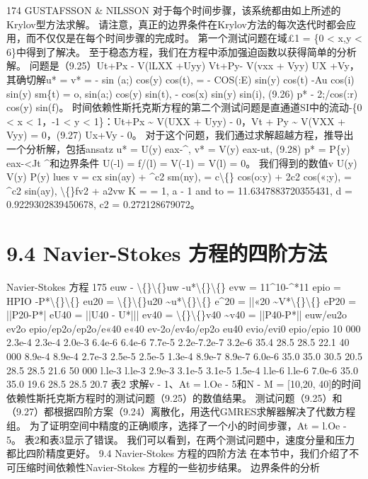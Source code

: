 \documentclass[UTF8,11pt,a4paper,openany,fontset=fandol]{ctexbook}
\begin{document}
174 GUSTAFSSON \& NILSSON 对于每个时间步骤，该系统都由如上所述的Krylov型方法求解。 请注意，真正的边界条件在Krylov方法的每次迭代时都会应用，而不仅仅是在每个时间步骤的完成时。 第一个测试问题在域£1 = \{0 < x,y < 6\}中得到了解决。 至于稳态方程，我们在方程中添加强迫函数以获得简单的分析解。 问题是（9.25）Ut+Px - V(lLXX +Uyy) Vt+Py- V(vxx + Vyy) UX +Vy，其确切解u* = v* = - sin (a;) cos(y) cos(t), = - COS(:E) sin(y) cos(t) -Au cos(i) sin(y) sm\{t) = o, sin(a;) cos(y) sin(t), - cos(x) sin(y) sin(i), (9.26) p* - 2;/cos(:r) cos(y) sin(f)。 时间依赖性斯托克斯方程的第二个测试问题是直通道SI中的流动-\{0 < x < 1，-1 < y < 1\}：Ut+Px \textasciitilde{} V(UXX + Uyy) - 0，Vt + Py \textasciitilde{} V(VXX + Vyy) = 0，(9.27) Ux+Vy - 0。 对于这个问题，我们通过求解超越方程，推导出一个分析解，包括ansatz u* = U(y) eax-\textasciicircum{}, v* = V(y) eax-ut, (9.28) p* = P\{y) eax-<Jt \textasciicircum{}和边界条件 U(-l) = f/(l) = V(-1) = V(l) = 0。 我们得到的数值v U(y) V(y) P(y) lues v = cx sin(ay) + \textasciicircum{}c2 sm(ny), = c\textbackslash\{\} cos(o:y) + 2c2 cos(«;y), = \textasciicircum{}c2 sin(ay), \textbackslash\{\}fv2 + a2vw K = = 1, a - 1 and to = 11.6347883720355431, d = 0.9229302839450678, c2 = 0.272128679072。

\section{9.4 Navier-Stokes 方程的四阶方法}
Navier-Stokes 方程 175 euw - \textbackslash\{\}\textbackslash\{\}uw -u*\textbackslash\{\}\textbackslash\{\} evw = 11\textasciicircum{}10-\textasciicircum{}*11 epio = HPIO -P*\textbackslash\{\}\textbackslash\{\} eu20 = \textbackslash\{\}\textbackslash\{\}u20 \textasciitilde{}u*\textbackslash\{\}\textbackslash\{\} e\textasciicircum{}20 = ||«20 \textasciitilde{}V*\textbackslash\{\}\textbackslash\{\} eP20 = ||P20-P*| eU40 = ||U40 - U*||| ev40 = \textbackslash\{\}\textbackslash\{\}v40 \textasciitilde{}v40 = ||P40-P*|| euw/eu2o ev2o epio/ep2o/ep2o/e«40 e«40 ev-2o/ev4o/ep2o eu40 evio/evi0 epio/epio 10 000 2.3e-4 2.3e-4 2.0e-3 6.4e-6 6.4e-6 7.7e-5 2.2e-7.2e-7 3.2e-6 35.4 28.5 28.5 22.1 40 000 8.9e-4 8.9e-4 2.7e-3 2.5e-5 2.5e-5 1.3e-4 8.9e-7 8.9e-7 6.0e-6 35.0 35.0 30.5 20.5 28.5 28.5 21.6 50 000 l.le-3 l.le-3 2.9e-3 3.1e-5 3.1e-5 1.5e-4 l.le-6 l.le-6 7.0e-6 35.0 35.0 19.6 28.5 28.5 20.7 表2 求解v - 1、At = l.Oe - 5和N - M = [10,20, 40]的时间依赖性斯托克斯方程时的测试问题（9.25）的数值结果。 测试问题（9.25）和（9.27）都根据四阶方案（9.24）离散化，用迭代GMRES求解器解决了代数方程组。 为了证明空间中精度的正确顺序，选择了一个小的时间步骤，At = l.Oe - 5。 表2和表3显示了错误。 我们可以看到，在两个测试问题中，速度分量和压力都比四阶精度更好。 9.4 Navier-Stokes 方程的四阶方法 在本节中，我们介绍了不可压缩时间依赖性Navier-Stokes 方程的一些初步结果。 边界条件的分析
\end{document}
